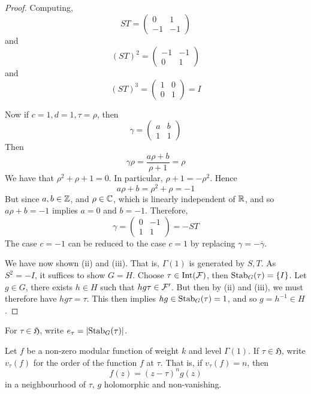\documentclass{article}
\newcommand{\mfH}{\mathfrak{H}}
\begin{document}
\begin{proof}
    Computing,
    \[ST = \begin{pmatrix}
        0 & 1 \\
        -1 & -1
    \end{pmatrix}\]
    and
    \[(ST)^2 = \begin{pmatrix}
        -1 & -1 \\
        0 & 1
    \end{pmatrix}\]
    and
    \[(ST)^3 = \begin{pmatrix}
        1 & 0\\
        0 & 1
    \end{pmatrix} = I\]

    Now if \(c = 1, d = 1, \tau = \rho\), then
    \[\gamma = \begin{pmatrix}
        a & b \\
        1 & 1
    \end{pmatrix}\]
    Then
    \[\gamma\rho = \frac{a\rho+ b}{\rho + 1} = \rho\]
    We have that \(\rho^2 + \rho + 1 = 0\). In particular, \(\rho + 1 = -\rho^2\). Hence
    \[a\rho + b = \rho^2 + \rho = -1\]
    But since \(a, b \in \mathbb{Z}\), and \(\rho \in \mathbb{C}\), which is linearly independent of \(\mathbb{R}\), and so \(a\rho + b = -1\) implies \(a = 0\) and \(b = -1\). Therefore,
    \[\gamma =\begin{pmatrix}
        0 & -1 \\
        1 & 1
    \end{pmatrix} = -ST\]
    The case \(c = -1\) can be reduced to the case \(c = 1\) by replacing \(\gamma = -\overline{\gamma}\).

    We have now shown (ii) and (iii). That is, \(\Gamma(1)\) is generated by \(S, T\). As \(S^2 = -I\), it suffices to show \(G = H\). Choose \(\tau \in \operatorname{Int}(\mathcal{F})\), then \(\operatorname{Stab}_G(\tau) = \{I\}\). Let \(g \in G\), there exists \(h \in H\) such that \(hg\tau \in \mathcal{F}'\). But then by (ii) and (iii), we must therefore have \(hg\tau = \tau\). This then implies \(hg \in \operatorname{Stab}_G(\tau) = 1\), and so \(g = h^{-1} \in H\).
\end{proof}

\lec

\begin{notation}
    For \(\tau \in \mfH\), write \(e_\tau = \abs{\operatorname{Stab}_G(\tau)}\).
\end{notation}

Let \(f\) be a non-zero modular function of weight \(k\) and level \(\Gamma(1)\). If \(\tau \in \mfH\), write \(v_\tau(f)\) for the order of the function \(f\) at \(\tau\). That is, if \(v_\tau(f) = n\), then
\[f(z) = (z-\tau)^n g(z)\]
in a neighbourhood of \(\tau\), \(g\) holomorphic and non-vanishing.
\end{document}
